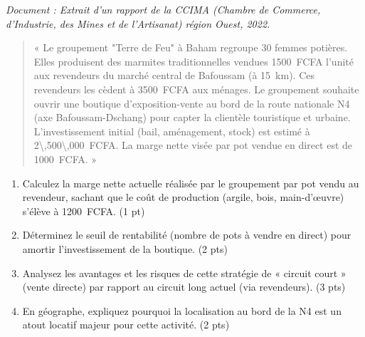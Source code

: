 \documentclass[11pt]{article}
\begin{document}
\begin{exercice}
\textit{Document : Extrait d'un rapport de la CCIMA (Chambre de Commerce, d'Industrie, des Mines et de l'Artisanat) région Ouest, 2022.}
\begin{quote}
« Le groupement "Terre de Feu" à Baham regroupe 30 femmes potières. Elles produisent des marmites traditionnelles vendues \SI{1500}{FCFA} l'unité aux revendeurs du marché central de Bafoussam (à \SI{15}{km}). Ces revendeurs les cèdent à \SI{3500}{FCFA} aux ménages. Le groupement souhaite ouvrir une boutique d'exposition-vente au bord de la route nationale N4 (axe Bafoussam-Dschang) pour capter la clientèle touristique et urbaine. L'investissement initial (bail, aménagement, stock) est estimé à \SI{2\,500\,000}{FCFA}. La marge nette visée par pot vendue en direct est de \SI{1000}{FCFA}. »
\end{quote}

\begin{enumerate}
\item Calculez la marge nette actuelle réalisée par le groupement par pot vendu au revendeur, sachant que le coût de production (argile, bois, main-d'œuvre) s'élève à \SI{1200}{FCFA}. \hfill (1 pt)
\item Déterminez le seuil de rentabilité (nombre de pots à vendre en direct) pour amortir l'investissement de la boutique. \hfill (2 pts)
\item Analysez les avantages et les risques de cette stratégie de « circuit court » (vente directe) par rapport au circuit long actuel (via revendeurs). \hfill (3 pts)
\item En géographe, expliquez pourquoi la localisation au bord de la N4 est un atout locatif majeur pour cette activité. \hfill (2 pts)
\end{enumerate}
\end{exercice}
\end{document}
